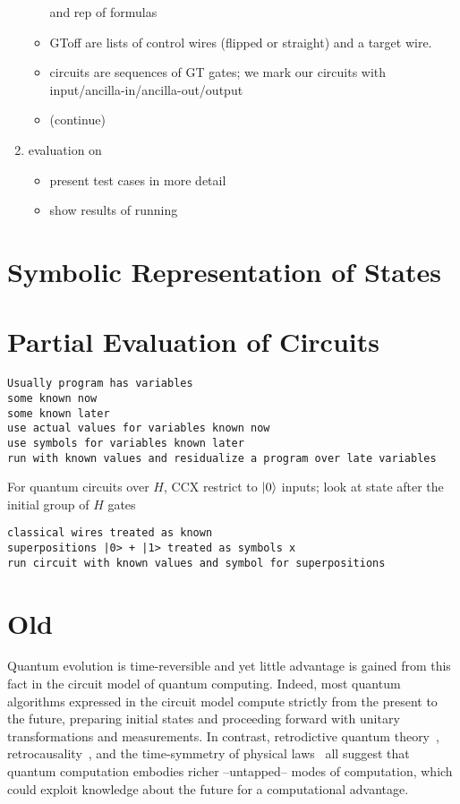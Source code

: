 \documentclass[sigplan]{acmart}
\begin{document}
\begin{enumerate}
\begin{itemize}
        and rep of formulas
      \item GToff are lists of control wires (flipped or straight) and a target wire.
      \item circuits are sequences of GT gates; we mark our circuits with input/ancilla-in/ancilla-out/output
      \item (continue)
    \end{itemize}
  \item evaluation on
    \begin{itemize}
      \item present test cases in more detail
      \item show results of running
    \end{itemize}
\end{enumerate}

\section{Symbolic Representation of States} 
 
\section{Partial Evaluation of Circuits}

\begin{verbatim}
Usually program has variables
some known now
some known later
use actual values for variables known now
use symbols for variables known later
run with known values and residualize a program over late variables
\end{verbatim}

For quantum circuits over $H$, CCX
restrict to $\ket{0}$ inputs; look at state after the initial group of
$H$ gates
\begin{verbatim}
classical wires treated as known
superpositions |0> + |1> treated as symbols x
run circuit with known values and symbol for superpositions
\end{verbatim}

\section{Old}

Quantum evolution is time-reversible and yet little
advantage is gained from this fact in the circuit model of quantum
computing. Indeed, most quantum algorithms expressed in the circuit
model compute strictly from the present to the future, preparing
initial states and proceeding forward with unitary transformations and
measurements. In contrast, retrodictive quantum
theory~\cite{sym13040586}, retrocausality~\cite{Aharonov2008}, and the
time-symmetry of physical laws~\cite{RevModPhys.27.179} all suggest
that quantum computation embodies richer --untapped-- modes of
computation, which could exploit knowledge about the future for a
computational advantage.
\end{document}
